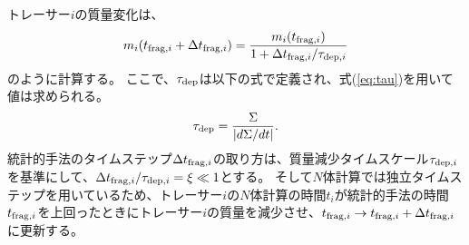 \documentclass[a4paper,10pt,oneside,twocolumn,notitlepage,final]{jarticle}
\begin{document}
トレーサー$i$の質量変化は、
\begin{align}
 m_i(t_{{\rm frag},i} + \Delta t_{{\rm frag},i}) = \frac{m_i(t_{{\rm frag},i})}{1 + \Delta t_{{\rm frag},i}/\tau_{{\rm dep},i}}
\end{align}
のように計算する。
ここで、$\tau_{\rm dep}$は以下の式で定義され、式(\ref{eq:tau})を用いて値は求められる。
\begin{align}
 \tau_{\rm dep} = \frac{\Sigma}{|d \Sigma/ dt|}.
\end{align}
統計的手法のタイムステップ$\Delta t_{{\rm frag},i}$の取り方は、質量減少タイムスケール$\tau_{{\rm dep},i}$を基準にして、$\Delta t_{{\rm frag},i}/\tau_{{\rm dep},i} = \xi \ll 1$とする。
そして$N$体計算では独立タイムステップを用いているため、トレーサー$i$の$N$体計算の時間$t_i$が統計的手法の時間$t_{{\rm frag},i}$を上回ったときにトレーサー$i$の質量を減少させ、$t_{{\rm frag},i} \to t_{{\rm frag},i} + \Delta t_{{\rm frag},i}$に更新する。



\end{document}
